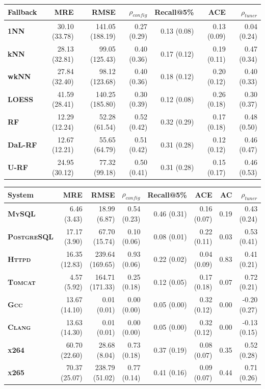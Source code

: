 \begin{tabular}{lrrrrrr}
\toprule
\textbf{Fallback} & \textbf{MRE} & \textbf{RMSE} & \textbf{$\rho_{config}$} & \textbf{Recall@5\%} & \textbf{ACE} & \textbf{$\rho_{tuner}$} \\
\midrule
\textbf{1NN} & 30.10 (33.78) & 141.05 (188.19) & 0.27 (0.29) & 0.13 (0.08) & 0.13 (0.09) & 0.04 (0.24) \\
\textbf{kNN} & 28.13 (32.81) & 99.05 (125.43) & 0.40 (0.36) & 0.17 (0.12) & 0.19 (0.11) & 0.47 (0.34) \\
\textbf{wkNN} & 27.84 (32.40) & 98.12 (123.68) & 0.40 (0.36) & 0.18 (0.12) & 0.20 (0.12) & 0.40 (0.33) \\
\textbf{LOESS} & 41.59 (28.41) & 140.25 (185.80) & 0.30 (0.39) & 0.12 (0.08) & 0.26 (0.18) & 0.30 (0.37) \\
\textbf{RF} & 12.29 (12.24) & 52.28 (61.54) & 0.52 (0.42) & 0.32 (0.29) & 0.17 (0.18) & 0.48 (0.50) \\
\textbf{DaL-RF} & 12.67 (12.21) & 55.65 (64.79) & 0.51 (0.42) & 0.31 (0.28) & 0.12 (0.12) & 0.46 (0.47) \\
\textbf{U-RF} & 24.95 (30.12) & 77.32 (99.18) & 0.50 (0.41) & 0.31 (0.28) & 0.15 (0.17) & 0.46 (0.53) \\
\bottomrule
\end{tabular}

\begin{tabular}{lrrrrrrr}
\toprule
\textbf{System} & \textbf{MRE} & \textbf{RMSE} & \textbf{$\rho_{config}$} & \textbf{Recall@5\%} & \textbf{ACE} & \textbf{AC} & \textbf{$\rho_{tuner}$} \\
\midrule
\textbf{\textsc{MySQL}} & 6.46 (3.43) & 18.99 (6.87) & 0.54 (0.23) & 0.46 (0.31) & 0.16 (0.07) & 0.19 & 0.43 (0.24) \\
\textbf{\textsc{PostgreSQL}} & 17.17 (3.90) & 67.70 (15.74) & 0.10 (0.06) & 0.08 (0.01) & 0.22 (0.11) & 0.03 & 0.53 (0.41) \\
\textbf{\textsc{Httpd}} & 16.35 (12.83) & 239.64 (169.65) & 0.93 (0.06) & 0.22 (0.02) & 0.04 (0.09) & 0.83 & 0.41 (0.21) \\
\textbf{\textsc{Tomcat}} & 4.57 (5.92) & 164.71 (171.33) & 0.25 (0.18) & 0.12 (0.05) & 0.17 (0.18) & 0.07 & 0.72 (0.21) \\
\textbf{\textsc{Gcc}} & 13.67 (14.10) & 0.01 (0.01) & 0.00 (0.00) & 0.05 (0.00) & 0.32 (0.12) & 0.00 & -0.20 (0.27) \\
\textbf{\textsc{Clang}} & 13.63 (14.30) & 0.01 (0.01) & 0.00 (0.00) & 0.05 (0.00) & 0.32 (0.12) & 0.00 & -0.13 (0.15) \\
\textbf{\textsc{x264}} & 60.70 (22.60) & 28.68 (8.04) & 0.73 (0.18) & 0.37 (0.19) & 0.08 (0.07) & 0.35 & 0.52 (0.28) \\
\textbf{\textsc{x265}} & 70.37 (25.07) & 238.79 (51.02) & 0.77 (0.14) & 0.41 (0.16) & 0.09 (0.07) & 0.44 & 0.71 (0.26) \\
\bottomrule
\end{tabular}

